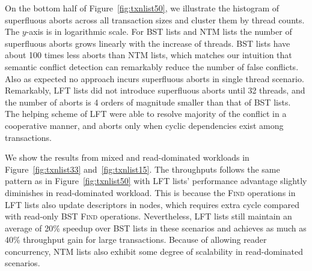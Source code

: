 \documentclass[10pt,conference,compsocconf]{IEEEtran}
\begin{document}
On the bottom half of Figure~\ref{fig:txnlist50}, we illustrate the histogram of superfluous aborts across all transaction sizes and cluster them by thread counts.
The $y$-axis is in logarithmic scale.
For BST lists and NTM lists the number of superfluous aborts grows linearly with the increase of threads.
BST lists have about 100 times less aborts than NTM lists, which matches our intuition that semantic conflict detection can remarkably reduce the number of false conflicts.
Also as expected no approach incurs superfluous aborts in single thread scenario.
Remarkably, LFT lists did not introduce superfluous aborts until 32 threads, and the number of aborts is 4 orders of magnitude smaller than that of BST lists. 
The helping scheme of LFT were able to resolve majority of the conflict in a cooperative manner, and aborts only when cyclic dependencies exist among transactions.

We show the results from mixed and read-dominated workloads in Figure~\ref{fig:txnlist33} and~\ref{fig:txnlist15}. 
The throughputs follows the same pattern as in Figure~\ref{fig:txnlist50} with LFT lists' performance advantage slightly diminishes in read-dominated workload.
This is because the \textsc{Find} operations in LFT lists also update descriptors in nodes, which requires extra cycle compared with read-only BST \textsc{Find} operations.
Nevertheless, LFT lists still maintain an average of 20\% speedup over BST lists in these scenarios and achieves as much as 40\% throughput gain for large transactions.  
Because of allowing reader concurrency, NTM lists also exhibit some degree of scalability in read-dominated scenarios.
\end{document}

